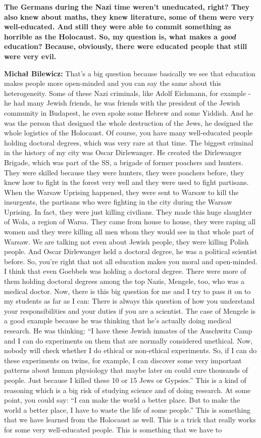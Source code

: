 \textbf{The Germans during the Nazi time weren’t uneducated, right? They also knew about maths, they knew literature, some of them were very well-educated. And still they were able to commit something as horrible as the Holocaust. So, my question is, what makes a \textit{good} education? Because, obviously, there were educated people that still were very evil.}

\textbf{Michał Bilewicz:} That’s a big question because basically we see that education makes people more open-minded and you can say the same about this heterogeneity. Some of these Nazi criminals, like Adolf Eichmann, for example - he had many Jewish friends, he was friends with the president of the Jewish community in Budapest, he even spoke some Hebrew and some Yiddish. And he was the person that designed the whole destruction of the Jews, he designed the whole logistics of the Holocaust. Of course, you have many well-educated people holding doctoral degrees, which was very rare at that time. The biggest criminal in the history of my city was Oscar Dirlewanger. He created the Dirlewanger Brigade, which was part of the SS, a brigade of former poachers and hunters. They were skilled because they were hunters, they were poachers before, they knew how to fight in the forest very well and they were used to fight partisans. When the Warsaw Uprising happened, they were sent to Warsaw to kill the insurgents, the partisans who were fighting in the city during the Warsaw Uprising. In fact, they were just killing civilians. They made this huge slaughter of Wola, a region of Warsa. They came from house to house, they were raping all women and they were killing all men whom they would see in that whole part of Warsaw. We are talking not even about Jewish people, they were killing Polish people. And Oscar Dirlewanger held a doctoral degree, he was a political scientist before. So, you're right that not all education makes you moral and open-minded. I think that even Goebbels was holding a doctoral degree. There were more of them holding doctoral degrees among the top Nazis, Mengele, too, who was a medical doctor. Now, there is this big question for me and I try to pass it on to my students as far as I can: There is always this question of how you understand your responsibilities and your duties if you are a scientist. The case of Mengele is a good example because he was thinking that he’s actually doing medical research. He was thinking: ``I have these Jewish inmates of the Auschwitz Camp and I can do experiments on them that are normally considered unethical. Now, nobody will check whether I do ethical or non-ethical experiments. So, if I can do these experiments on twins, for example, I can discover some very important patterns about human physiology that maybe later on could cure thousands of people. Just because I killed these 10 or 15 Jews or Gypsies.'' This is a kind of reasoning which is a big risk of studying science and of doing research. At some point, you could say: ``I can make the world a better place. But to make the world a better place, I have to waste the life of some people.'' This is something that we have learned from the Holocaust as well. This is a trick that really works for some very well-educated people. This is something that we have to 